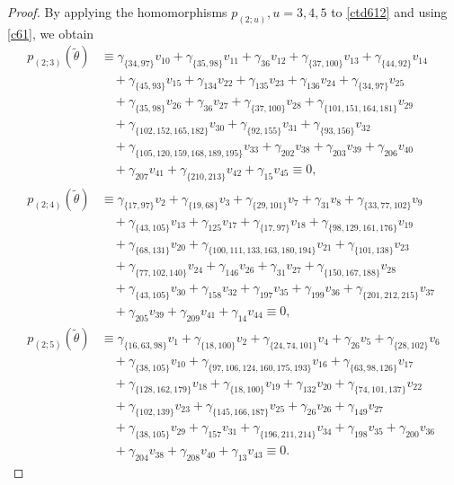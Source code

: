 \documentclass[reqno]{amsart}
\theoremstyle{plain}
\theoremstyle{definition}
\theoremstyle{plain}
\theoremstyle{definition}
\numberwithin{equation}{section}
\begin{document}
\begin{proof}
By applying the homomorphisms $p_{(2;u)}, u = 3,4,5$ to \eqref{ctd612} and using \eqref{c61}, we obtain
\begin{align*}
p_{(2;3)}(\widetilde\theta) &\equiv \gamma_{\{34,97\}}v_{10} + \gamma_{\{35,98\}}v_{11} + \gamma_{36}v_{12} + \gamma_{\{37,100\}}v_{13} + \gamma_{\{44,92\}}v_{14}\\ 
&\quad + \gamma_{\{45,93\}}v_{15} + \gamma_{134}v_{22} + \gamma_{135}v_{23} + \gamma_{136}v_{24} + \gamma_{\{34,97\}}v_{25}\\ 
&\quad + \gamma_{\{35,98\}}v_{26} + \gamma_{36}v_{27} + \gamma_{\{37,100\}}v_{28} + \gamma_{\{101,151,164,181\}}v_{29}\\ 
&\quad + \gamma_{\{102,152,165,182\}}v_{30} + \gamma_{\{92,155\}}v_{31} + \gamma_{\{93,156\}}v_{32}\\ 
&\quad + \gamma_{\{105,120,159,168,189,195\}}v_{33} + \gamma_{202}v_{38} + \gamma_{203}v_{39} + \gamma_{206}v_{40}\\ 
&\quad + \gamma_{207}v_{41} + \gamma_{\{210,213\}}v_{42} + \gamma_{15}v_{45} \equiv 0,\\
p_{(2;4)}(\widetilde\theta) &\equiv \gamma_{\{17,97\}}v_{2} + \gamma_{\{19,68\}}v_{3} + \gamma_{\{29,101\}}v_{7} + \gamma_{31}v_{8} + \gamma_{\{33,77,102\}}v_{9}\\ 
&\quad + \gamma_{\{43,105\}}v_{13} + \gamma_{125}v_{17} + \gamma_{\{17,97\}}v_{18} + \gamma_{\{98,129,161,176\}}v_{19}\\ 
&\quad + \gamma_{\{68,131\}}v_{20} + \gamma_{\{100,111,133,163,180,194\}}v_{21} + \gamma_{\{101,138\}}v_{23}\\ 
&\quad + \gamma_{\{77,102,140\}}v_{24} + \gamma_{146}v_{26} + \gamma_{31}v_{27} + \gamma_{\{150,167,188\}}v_{28}\\ 
&\quad + \gamma_{\{43,105\}}v_{30} + \gamma_{158}v_{32} + \gamma_{197}v_{35} + \gamma_{199}v_{36} + \gamma_{\{201,212,215\}}v_{37}\\ 
&\quad + \gamma_{205}v_{39} + \gamma_{209}v_{41} + \gamma_{14}v_{44} \equiv 0,\\
p_{(2;5)}(\widetilde\theta) &\equiv \gamma_{\{16,63,98\}}v_{1} + \gamma_{\{18,100\}}v_{2} + \gamma_{\{24,74,101\}}v_{4} + \gamma_{26}v_{5} + \gamma_{\{28,102\}}v_{6}\\ 
&\quad + \gamma_{\{38,105\}}v_{10} + \gamma_{\{97,106,124,160,175,193\}}v_{16} + \gamma_{\{63,98,126\}}v_{17}\\ 
&\quad + \gamma_{\{128,162,179\}}v_{18} + \gamma_{\{18,100\}}v_{19} + \gamma_{132}v_{20} + \gamma_{\{74,101,137\}}v_{22}\\ 
&\quad + \gamma_{\{102,139\}}v_{23} + \gamma_{\{145,166,187\}}v_{25} + \gamma_{26}v_{26} + \gamma_{149}v_{27}\\ 
&\quad + \gamma_{\{38,105\}}v_{29} + \gamma_{157}v_{31} + \gamma_{\{196,211,214\}}v_{34} + \gamma_{198}v_{35} + \gamma_{200}v_{36}\\ 
&\quad + \gamma_{204}v_{38} + \gamma_{208}v_{40} + \gamma_{13}v_{43} \equiv 0.
\end{align*}


\end{proof}
\end{document}
